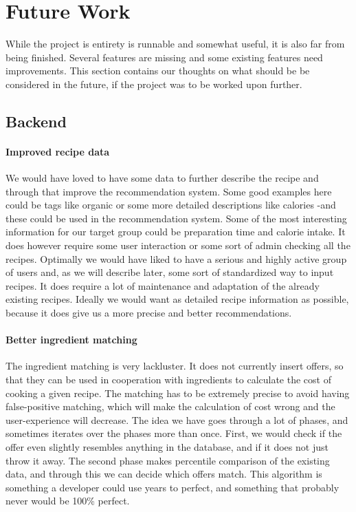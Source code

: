 \section{Future Work}
\label{sec:future}

While the project is entirety is runnable and somewhat useful, it is also far from being finished. Several features are missing and some existing features need improvements. This section contains our thoughts on what should be be considered in the future, if the project was to be worked upon further.

\subsection{Backend}

\paragraph{Improved recipe data} 
We would have loved to have some data to further describe the recipe and through that improve the recommendation system. Some good examples here could be tags like organic or some more detailed descriptions like calories -and these could be used in the recommendation system. Some of the most interesting information for our target group could be preparation time and calorie intake. It does however require some user interaction or some sort of admin checking all the recipes. Optimally we would have liked to have a serious and highly active group of users and, as we will describe later, some sort of standardized way to input recipes. It does require a lot of maintenance and adaptation of the already existing recipes. Ideally we would want as detailed recipe information as possible, because it does give us a more precise and better recommendations.

\paragraph{Better ingredient matching}
The ingredient matching is very lackluster. It does not currently insert offers, so that they can be used in cooperation with ingredients to calculate the cost of cooking a given recipe. The matching has to be extremely precise to avoid having false-positive matching, which will make the calculation of cost wrong and the user-experience will decrease. 
The idea we have goes through a lot of phases, and sometimes iterates over the phases more than once. First, we would check if the offer even slightly resembles anything in the database, and if it does not just throw it away. The second phase makes percentile comparison of the existing data, and through this we can decide which offers match. This algorithm is something a developer could use years to perfect, and something that probably never would be 100\% perfect.

